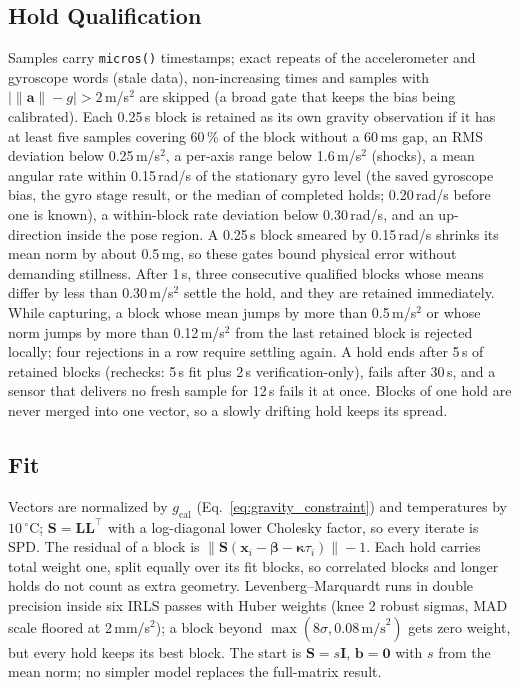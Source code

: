 \documentclass[conference]{IEEEtran}
\begin{document}
    \subsection{Hold Qualification}

    Samples carry \texttt{micros()} timestamps; exact repeats of the
    accelerometer and gyroscope words (stale data), non-increasing times and
    samples with $\bigl|\|\mathbf{a}\|-g\bigr| > 2\,$m/s$^2$ are skipped (a
    broad gate that keeps the bias being calibrated). Each 0.25\,s block is
    retained as its own gravity observation if it has at least five
    samples covering 60\,\% of the block without a 60\,ms gap, an RMS
    deviation below 0.25\,m/s$^2$, a per-axis range below 1.6\,m/s$^2$
    (shocks), a mean angular rate within 0.15\,rad/s of the stationary gyro
    level (the saved gyroscope bias, the gyro stage result, or the median of
    completed holds; 0.20\,rad/s before one is known), a within-block rate
    deviation below 0.30\,rad/s, and an up-direction inside the pose region.
    A 0.25\,s block smeared by 0.15\,rad/s shrinks its mean norm by about
    0.5\,mg, so these gates bound physical error without demanding
    stillness. After 1\,s, three consecutive qualified blocks whose means differ by less than
    0.30\,m/s$^2$ settle the hold, and they are retained immediately.
    While capturing, a block whose mean jumps by more than 0.5\,m/s$^2$ or
    whose norm jumps by more than 0.12\,m/s$^2$ from the last retained block
    is rejected locally; four rejections in a row require settling again.
    A hold ends after 5\,s of retained blocks (rechecks: 5\,s fit plus
    2\,s verification-only), fails after 30\,s, and a sensor that delivers
    no fresh sample for 12\,s fails it at once. Blocks of one hold are never
    merged into one vector, so a slowly drifting hold keeps its spread.

    \subsection{Fit}

    Vectors are normalized by $g_\text{cal}$ (Eq.~\eqref{eq:gravity_constraint})
    and temperatures by $10\,^\circ$C;
    $\mathbf{S} = \mathbf{L}\mathbf{L}^\top$ with a log-diagonal lower
    Cholesky factor, so every iterate is SPD. The residual of a block is
    $\|\mathbf{S}(\mathbf{x}_i - \boldsymbol\beta - \boldsymbol\kappa\tau_i)\| - 1$.
    Each hold carries total weight one, split equally over its fit blocks,
    so correlated blocks and longer holds do not count as extra geometry.
    Levenberg--Marquardt runs in double precision inside six IRLS passes
    with Huber weights (knee 2 robust sigmas, MAD scale floored at
    2\,mm/s$^2$); a block beyond $\max(8\sigma, 0.08\,\text{m/s}^2)$ gets zero
    weight, but every hold keeps its best block. The start is
    $\mathbf{S} = s\mathbf{I}$, $\mathbf{b}=\mathbf{0}$ with $s$ from the
    mean norm; no simpler model replaces the full-matrix result.
\end{document}
